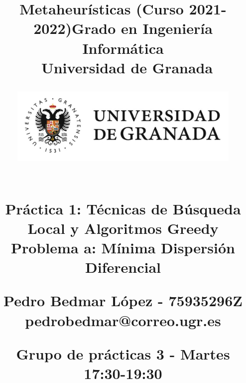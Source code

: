 



\title{	
\normalfont \normalsize 
\huge{\textbf{Metaheurísticas (Curso 2021-2022)}\linebreak \linebreak Grado en Ingeniería Informática \\ Universidad de Granada} \\ [23pt] %

\begin{figure}[H] %
    \centering
        \includegraphics[scale=0.4]{img/ugr.png}
\end{figure}

\horrule{0.5pt} \\[0.4cm] %
\huge Práctica 1: Técnicas de Búsqueda Local y Algoritmos Greedy \linebreak \linebreak%
\LARGE Problema a: Mínima Dispersión Diferencial
\horrule{2pt} \\[0.5cm] %
\vspace{0.7cm}

\Large{Pedro Bedmar López - 75935296Z} \\
\Large{pedrobedmar@correo.ugr.es} \linebreak

\large Grupo de prácticas 3 - Martes 17:30-19:30

}

\date{}




